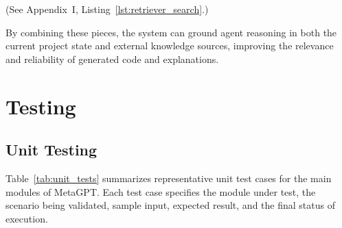 (See Appendix~I, Listing~\ref{lst:retriever_search}.)

By combining these pieces, the system can ground agent reasoning in both the current project state and external knowledge sources, improving the relevance and reliability of generated code and explanations.

\section{Testing}
\subsection{Unit Testing}

Table~\ref{tab:unit_tests} summarizes representative unit test cases for the main modules of MetaGPT. Each test case specifies the module under test, the scenario being validated, sample input, expected result, and the final status of execution.

